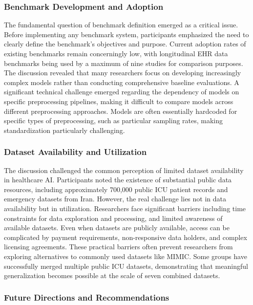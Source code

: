 \subsubsection{Benchmark Development and Adoption}
The fundamental question of benchmark definition emerged as a critical issue. Before implementing any benchmark system, participants emphasized the need to clearly define the benchmark's objectives and purpose. Current adoption rates of existing benchmarks remain concerningly low, with longitudinal EHR data benchmarks being used by a maximum of nine studies for comparison purposes. The discussion revealed that many researchers focus on developing increasingly complex models rather than conducting comprehensive baseline evaluations. A significant technical challenge emerged regarding the dependency of models on specific preprocessing pipelines, making it difficult to compare models across different preprocessing approaches. Models are often essentially hardcoded for specific types of preprocessing, such as particular sampling rates, making standardization particularly challenging.

\subsubsection{Dataset Availability and Utilization}

The discussion challenged the common perception of limited dataset availability in healthcare AI. Participants noted the existence of substantial public data resources, including approximately 700,000 public ICU patient records and emergency datasets from Iran. However, the real challenge lies not in data availability but in utilization. Researchers face significant barriers including time constraints for data exploration and processing, and limited awareness of available datasets. Even when datasets are publicly available, access can be complicated by payment requirements, non-responsive data holders, and complex licensing agreements. These practical barriers often prevent researchers from exploring alternatives to commonly used datasets like MIMIC. Some groups have successfully merged multiple public ICU datasets, demonstrating that meaningful generalization becomes possible at the scale of seven combined datasets.

\subsubsection{Future Directions and Recommendations}

